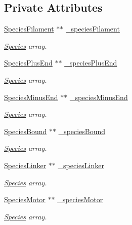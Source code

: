 \subsection*{Private Attributes}
{\bf }\par
\begin{DoxyCompactItemize}
\item 
\hyperlink{classSpeciesFilament}{Species\+Filament} $\ast$$\ast$ \hyperlink{classCMonomer_aa6d658b1fb0e90a549bfc0dedfc3b2a5}{\+\_\+species\+Filament}
\begin{DoxyCompactList}\small\item\em \hyperlink{classSpecies}{Species} array. \end{DoxyCompactList}\item 
\hyperlink{classSpeciesPlusEnd}{Species\+Plus\+End} $\ast$$\ast$ \hyperlink{classCMonomer_a536f3c948c52d79c73fe406048071e7b}{\+\_\+species\+Plus\+End}
\begin{DoxyCompactList}\small\item\em \hyperlink{classSpecies}{Species} array. \end{DoxyCompactList}\item 
\hyperlink{classSpeciesMinusEnd}{Species\+Minus\+End} $\ast$$\ast$ \hyperlink{classCMonomer_a76ec86baa9b2f8e4711389481b191584}{\+\_\+species\+Minus\+End}
\begin{DoxyCompactList}\small\item\em \hyperlink{classSpecies}{Species} array. \end{DoxyCompactList}\item 
\hyperlink{classSpeciesBound}{Species\+Bound} $\ast$$\ast$ \hyperlink{classCMonomer_a24078fb0d0c2d60e79af1cfea30b0d79}{\+\_\+species\+Bound}
\begin{DoxyCompactList}\small\item\em \hyperlink{classSpecies}{Species} array. \end{DoxyCompactList}\item 
\hyperlink{classSpeciesLinker}{Species\+Linker} $\ast$$\ast$ \hyperlink{classCMonomer_aa549a348f1f8e77283c4aaa2e555aca1}{\+\_\+species\+Linker}
\begin{DoxyCompactList}\small\item\em \hyperlink{classSpecies}{Species} array. \end{DoxyCompactList}\item 
\hyperlink{classSpeciesMotor}{Species\+Motor} $\ast$$\ast$ \hyperlink{classCMonomer_af3b42603df2c3e4dff67457bad776fd6}{\+\_\+species\+Motor}
\begin{DoxyCompactList}\small\item\em \hyperlink{classSpecies}{Species} array. \end{DoxyCompactList}\end{DoxyCompactItemize}



